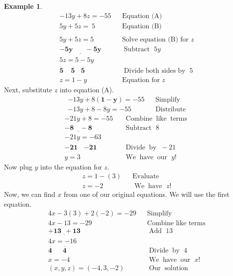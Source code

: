 \documentclass[12pt]{book}
\theoremstyle{definition}
\newtheorem{example}{Example}
\newcommand{\tmmathbf}[1]{\ensuremath{\boldsymbol{#1}}}
\newcommand{\tmop}[1]{\ensuremath{\operatorname{#1}}}
\begin{document}
\begin{example}
\begin{eqnarray*}
	   - 13 y + 8 z = - 55 &  & \text{Equation~(A)}\\
    5 y + 5 z = ~5~~~ &  & \text{Equation~(B)}\\
		&  & \\
    5 y + 5 z = 5~~~~~~~ &  & \text{Solve~equation~(B)~for~} z\\
    \tmmathbf{\underline{- 5 y ~~~~~~~~- 5 y}}~~~ &  & \tmop{Subtract~} 5 y\\
    5 z = 5 - 5 y &  & \\
    \tmmathbf{\overline{5} ~~~~~ \overline{5} ~~~~ \overline{5}}~ &  & \tmop{Divide~both~sides~by~} 5\\
    z = 1 - y~ &  & \text{Equation~for~} z
   \end{eqnarray*}
	Next, substitute $z$ into equation (A).
	 \begin{eqnarray*}
		- 13 y + 8 \tmmathbf{(1 - y)} = - 55 &  & \text{Simplify}\\
    - 13 y + 8 - 8 y = - 55 &  & \text{Distribute}
		\end{eqnarray*}
		\begin{eqnarray*}
    - 21 y + 8 = - 55 &  & \tmop{Combine} \tmop{like} \tmop{terms}\\
    \tmmathbf{\underline{- 8 ~~~~- 8}} &  &  \tmop{Subtract~} 8\\
    - 21 y = - 63 &  & \\
    \tmmathbf{\overline{- 21} ~~~~ \overline{- 21}} &  & \tmop{Divide} \tmop{by~} - 21\\
    y = 3~~~~  &  & \tmop{We} \tmop{have} \tmop{our~} y!
		\end{eqnarray*}
	Now plug $y$ into the equation for $z$.
	 \begin{eqnarray*}
	  z = 1 - (3) &  & \tmop{Evaluate}\\
    z = - 2~~~~~ &  & \tmop{We} \tmop{have~} z!
		\end{eqnarray*}
	Now, we can find $x$ from one of our original equations.  We will use the first equation.
		\begin{eqnarray*}
    4 x - 3 (3) + 2 (- 2) = - 29 &  & \text{Simplify}\\
    4 x - 13 = - 29 &  & \text{Combine~like~terms}\\
    \tmmathbf{\underline{+ 13 ~~+ 13}} &  &		\tmop{Add~} 13\\
    4 x = - 16 &  & \\
    \tmmathbf{\overline{4} ~~~~~~~ \overline{4}}~ &  & \tmop{Divide} \tmop{by~} 4\\
    x = - 4~ &  & \tmop{We} \tmop{have} \tmop{our~} x!\\
    (x,y,z)=(- 4, 3, - 2) &  & \tmop{Our} \tmop{solution}
  \end{eqnarray*}
\end{example}
\end{document}
